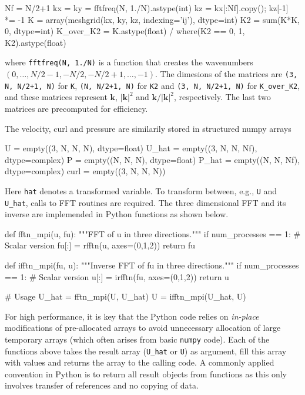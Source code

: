 \documentclass[11pt, oneside]{article}
\newcommand{\inpyth}{\lstinline[style=pythonstyle, basicstyle=\ttfamily]} %[]%
\begin{document}
\begin{python}
Nf = N/2+1
kx = ky = fftfreq(N, 1./N).astype(int)
kz = kx[:Nf].copy(); kz[-1] *= -1
K = array(meshgrid(kx, ky, kz, indexing='ij'), dtype=int)
K2 = sum(K*K, 0, dtype=int)
K_over_K2 = K.astype(float) / where(K2 == 0, 1, K2).astype(float)
\end{python}
where \inpyth{fftfreq(N, 1./N)} is a function that creates the wavenumbers $(0, \ldots, N/2-1, -N/2, -N/2+1, \ldots, -1)$. The dimesions of the matrices are \inpyth{(3, N, N/2+1, N)} for \texttt{K}, \inpyth{(N, N/2+1, N)} for \texttt{K2} and \inpyth{(3, N, N/2+1, N)} for \texttt{K\_over\_K2}, and these matrices represent $\bm{k}$, $|\bm{k}|^2$ and $\bm{k}/|\bm{k}|^2$, respectively. The last two matrices are precomputed for efficiency.

The velocity, curl and pressure are similarily stored in structured numpy arrays

\begin{python}
U     = empty((3, N, N, N),  dtype=float)
U_hat = empty((3, N, N, Nf), dtype=complex)
P     = empty((N, N, N),     dtype=float)
P_hat = empty((N, N, Nf),    dtype=complex)
curl  = empty((3, N, N, N))
\end{python}
Here \inpyth{hat} denotes a transformed variable. To transform between, e.g., \inpyth{U} and \inpyth{U_hat}, calls to FFT routines are required. The three dimensional FFT and its inverse are implemended in Python functions as shown below.

\begin{python}
def fftn_mpi(u, fu):
    """FFT of u in three directions."""
    if num_processes == 1:                # Scalar version
        fu[:] = rfftn(u, axes=(0,1,2))
    return fu

def ifftn_mpi(fu, u):
    """Inverse FFT of fu in three directions."""
    if num_processes == 1:                # Scalar version
        u[:] = irfftn(fu, axes=(0,1,2))
    return u

# Usage
U_hat = fftn_mpi(U, U_hat)
U = ifftn_mpi(U_hat, U)
\end{python}
For high performance, it is key that the Python code relies on \emph{in-place}
modifications of pre-allocated arrays to avoid unnecessary allocation of
large temporary arrays (which often arises from basic \texttt{numpy} code).
Each of the functions above takes the result array (\texttt{U\_hat} or
\texttt{U}) as argument, fill this array with values and returns the
array to the calling code. A commonly applied convention in
Python is to return all result objects from functions as this only involves
transfer of references and no copying of data.
\end{document}
